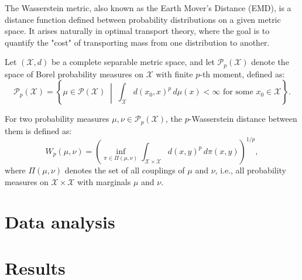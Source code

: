 \documentclass[
	12pt,				%
	oneside,			%
	a4paper,			%
	english,			%
	brazil				%
	]{abntex2ppgsi}
\begin{document}

The Wasserstein metric, also known as the Earth Mover's Distance (EMD), is a distance function defined between probability distributions on a given metric space. It arises naturally in optimal transport theory, where the goal is to quantify the "cost" of transporting mass from one distribution to another.

Let $(\mathcal{X}, d)$ be a complete separable metric space, and let $\mathcal{P}_p(\mathcal{X})$ denote the space of Borel probability measures on $\mathcal{X}$ with finite $p$-th moment, defined as:
\[
\mathcal{P}_p(\mathcal{X}) = \left\{ \mu \in \mathcal{P}(\mathcal{X}) \; \middle| \; \int_{\mathcal{X}} d(x_0, x)^p \, d\mu(x) < \infty \text{ for some } x_0 \in \mathcal{X} \right\}.
\]

For two probability measures $\mu, \nu \in \mathcal{P}_p(\mathcal{X})$, the $p$-Wasserstein distance between them is defined as:
\[
W_p(\mu, \nu) = \left( \inf_{\pi \in \Pi(\mu, \nu)} \int_{\mathcal{X} \times \mathcal{X}} d(x, y)^p \, d\pi(x, y) \right)^{1/p},
\]
where $\Pi(\mu, \nu)$ denotes the set of all couplings of $\mu$ and $\nu$, i.e., all probability measures on $\mathcal{X} \times \mathcal{X}$ with marginals $\mu$ and $\nu$.


\chapter{Data analysis}

\chapter{Results}
\end{document}
